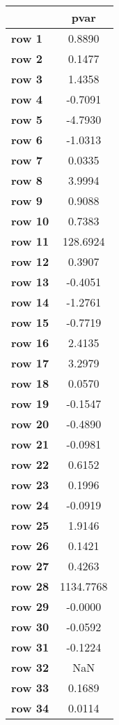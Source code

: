 \begin{tiny}\begin{tabular}{|l|c|}
\hline
&\textbf{pvar}\\\hline
\textbf{row 1}&0.8890\\\hline
\textbf{row 2}&0.1477\\\hline
\textbf{row 3}&1.4358\\\hline
\textbf{row 4}&-0.7091\\\hline
\textbf{row 5}&-4.7930\\\hline
\textbf{row 6}&-1.0313\\\hline
\textbf{row 7}&0.0335\\\hline
\textbf{row 8}&3.9994\\\hline
\textbf{row 9}&0.9088\\\hline
\textbf{row 10}&0.7383\\\hline
\textbf{row 11}&128.6924\\\hline
\textbf{row 12}&0.3907\\\hline
\textbf{row 13}&-0.4051\\\hline
\textbf{row 14}&-1.2761\\\hline
\textbf{row 15}&-0.7719\\\hline
\textbf{row 16}&2.4135\\\hline
\textbf{row 17}&3.2979\\\hline
\textbf{row 18}&0.0570\\\hline
\textbf{row 19}&-0.1547\\\hline
\textbf{row 20}&-0.4890\\\hline
\textbf{row 21}&-0.0981\\\hline
\textbf{row 22}&0.6152\\\hline
\textbf{row 23}&0.1996\\\hline
\textbf{row 24}&-0.0919\\\hline
\textbf{row 25}&1.9146\\\hline
\textbf{row 26}&0.1421\\\hline
\textbf{row 27}&0.4263\\\hline
\textbf{row 28}&1134.7768\\\hline
\textbf{row 29}&-0.0000\\\hline
\textbf{row 30}&-0.0592\\\hline
\textbf{row 31}&-0.1224\\\hline
\textbf{row 32}&NaN\\\hline
\textbf{row 33}&0.1689\\\hline
\textbf{row 34}&0.0114\\\hline

\end{tabular}
\end{tiny}
